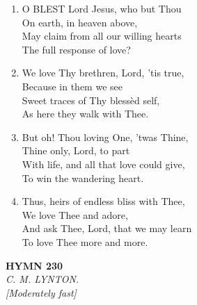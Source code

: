 \documentclass[11pt,a4paper]{article}
\begin{document}
\begin{enumerate}
    \item O BLEST Lord Jesus, who but Thou \\
            On earth, in heaven above, \\
        May claim from all our willing hearts \\
            The full response of love?

    \item We love Thy brethren, Lord, 'tis true, \\
            Because in them we see \\
        Sweet traces of Thy bless\`ed self, \\
            As here they walk with Thee.

    \item But oh! Thou loving One, 'twas Thine, \\
            Thine only, Lord, to part \\
        With life, and all that love could give, \\
            To win the wandering heart.

    \item Thus, heirs of endless bliss with Thee, \\
            We love Thee and adore, \\
        And ask Thee, Lord, that we may learn \\
            To love Thee more and more.

\end{enumerate}

\newpage
\begin{center}
    {\Large \textbf{HYMN 230}}
    \\
    \textit{C. M. LYNTON.}
    \\
    \textit{\small [Moderately fast]}
\end{center}
\vspace{1em}
\end{document}
